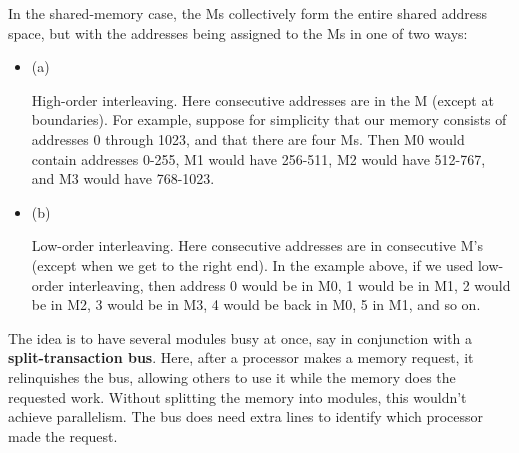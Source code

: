 In the shared-memory case, the Ms collectively form the entire
shared address space, but with the addresses being assigned to the Ms in
one of two ways:

\begin{itemize}

\item (a)

High-order interleaving. Here consecutive addresses are in the
 M (except at boundaries). For example, suppose for
simplicity that our memory consists of addresses 0 through 1023, and
that there are four Ms.  Then M0 would contain addresses 0-255, M1 would
have 256-511, M2 would have 512-767, and M3 would have 768-1023.

\item (b)

Low-order interleaving. Here consecutive addresses are in consecutive
M's (except when we get to the right end). In the example above, if we
used low-order interleaving, then address 0 would be in M0, 1 would be
in M1, 2 would be in M2, 3 would be in M3, 4 would be back in M0, 5 in
M1, and so on.

\end{itemize}

The idea is to have several modules busy at once, say in conjunction
with a {\bf split-transaction bus}.  Here, after a processor makes a
memory request, it relinquishes the bus, allowing others to use it while
the memory does the requested work.  Without splitting the memory into
modules, this wouldn't achieve parallelism.  The bus does need extra
lines to identify which processor made the request.

%
%
%
%
%


